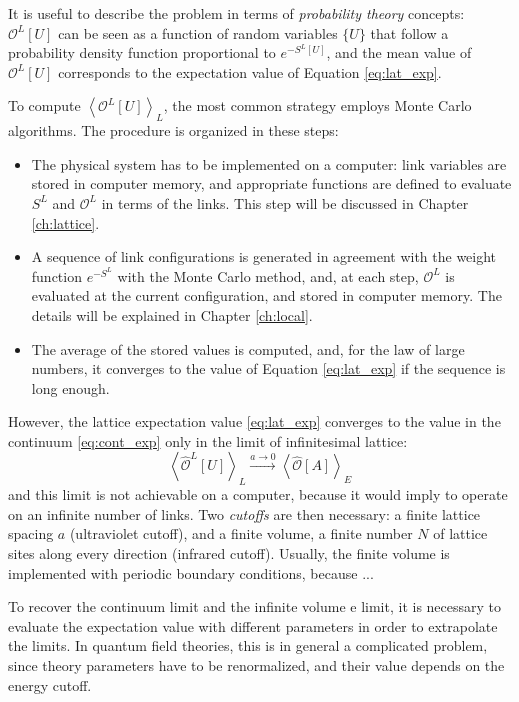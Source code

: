 It is useful to describe the problem in terms of \emph{probability theory} concepts:
$\mathcal O^L[U]$ can be seen as a function of random variables $\{U\}$ that follow a probability density function proportional to $e^{-S^L[U]}$,
and the mean value of $\mathcal O^L[U]$ corresponds to the expectation value of Equation \eqref{eq:lat_exp}.

To compute $\left<\mathcal O^L[U]\right>_L$, the most common strategy employs Monte Carlo algorithms.
The procedure is organized in these steps:
\begin{itemize}
    \item The physical system has to be implemented on a computer: link variables are stored in computer memory,
        and appropriate functions are defined to evaluate $S^L$ and $\mathcal O^L$ in terms of the links.
        This step will be discussed in Chapter \ref{ch:lattice}.
    \item A sequence of link configurations is generated in agreement with the weight function $e^{-S^L}$ with the Monte Carlo method, and, at each step,
        $\mathcal O^L$ is evaluated at the current configuration, and stored in computer memory. The details will be explained in Chapter \ref{ch:local}.
    \item The average of the stored values is computed, and, for the law of large numbers,
        it converges to the value of Equation \ref{eq:lat_exp} if the sequence is long enough.
\end{itemize}

However, the lattice expectation value \eqref{eq:lat_exp} converges to the value in the continuum \eqref{eq:cont_exp} only in the limit of infinitesimal lattice:
\begin{equation}\label{eq:cont_limit}
    \left<\hat{\mathcal O}^L[U]\right>_L \xrightarrow{a\to0} \left<\hat{\mathcal O}[A]\right>_E
\end{equation}
and this limit is not achievable on a computer, because it would imply to operate on an infinite number of links.
Two \emph{cutoffs} are then necessary: a finite lattice spacing $a$ (ultraviolet cutoff),
and a finite volume, \ie a finite number $N$ of lattice sites along every direction (infrared cutoff).
Usually, the finite volume is implemented with periodic boundary conditions, because ... 

To recover the continuum limit and the infinite volume e limit,
it is necessary to evaluate the expectation value with different parameters in order to extrapolate the limits.
In quantum field theories, this is in general a complicated problem,
since theory parameters have to be renormalized, and their value depends on the energy cutoff.

